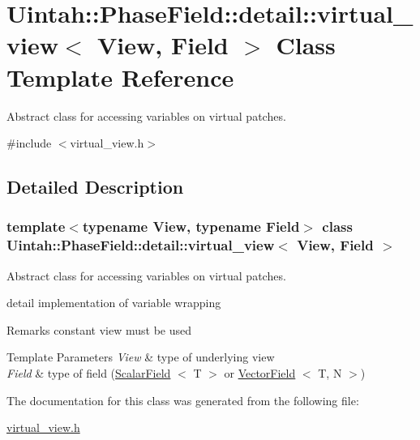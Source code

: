 \hypertarget{classUintah_1_1PhaseField_1_1detail_1_1virtual__view}{}\section{Uintah\+:\+:Phase\+Field\+:\+:detail\+:\+:virtual\+\_\+view$<$ View, Field $>$ Class Template Reference}
\label{classUintah_1_1PhaseField_1_1detail_1_1virtual__view}


Abstract class for accessing variables on virtual patches.  




{\ttfamily \#include $<$virtual\+\_\+view.\+h$>$}



\subsection{Detailed Description}
\subsubsection*{template$<$typename View, typename Field$>$\newline
class Uintah\+::\+Phase\+Field\+::detail\+::virtual\+\_\+view$<$ View, Field $>$}

Abstract class for accessing variables on virtual patches. 

detail implementation of variable wrapping

\begin{DoxyRemark}{Remarks}
constant view must be used
\end{DoxyRemark}

\begin{DoxyTemplParams}{Template Parameters}
{\em View} & type of underlying view \\
\hline
{\em Field} & type of field (\hyperlink{structUintah_1_1PhaseField_1_1ScalarField}{Scalar\+Field} $<$ T $>$ or \hyperlink{structUintah_1_1PhaseField_1_1VectorField}{Vector\+Field} $<$ T, N $>$) \\
\hline
\end{DoxyTemplParams}


The documentation for this class was generated from the following file\+:\begin{DoxyCompactItemize}
\item 
\hyperlink{virtual__view_8h}{virtual\+\_\+view.\+h}\end{DoxyCompactItemize}
